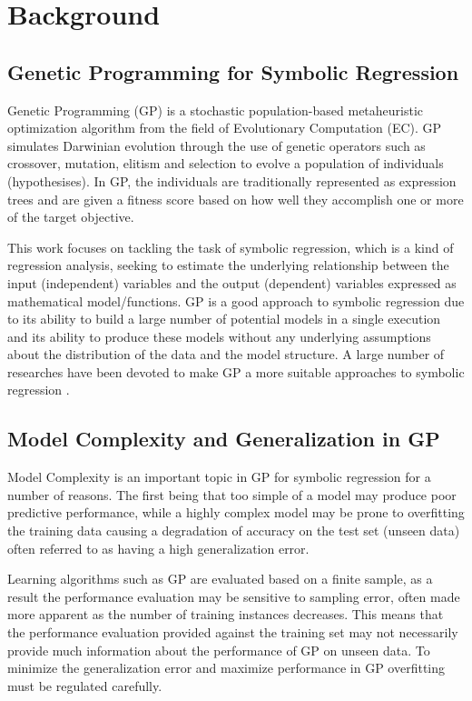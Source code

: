 \documentclass[conference]{IEEEtran}
\begin{document}
\section{Background}
\label{se:bg}

\subsection{Genetic Programming for Symbolic Regression}

Genetic Programming (GP) is a stochastic population-based metaheuristic optimization algorithm from the field of Evolutionary Computation (EC). GP simulates Darwinian evolution through the use of genetic operators such as crossover, mutation, elitism and selection to evolve a population of individuals (hypothesises). In GP, the individuals are traditionally represented as expression trees and are given a fitness score based on how well they accomplish one or more of the target objective. 


This work focuses on tackling the task of symbolic regression, which is a kind of regression analysis, seeking to estimate the underlying relationship between the input (independent) variables and the output (dependent) variables expressed as mathematical model/functions. GP is a good approach to symbolic regression due to its ability to build a large number of potential models in a single execution and its ability to produce these models without any underlying assumptions about the distribution of the data and the model structure. A large number of researches have been devoted to make GP a more suitable approaches to symbolic regression \cite{b16,b17,b18,b19}.

\subsection{Model Complexity and Generalization in GP}

Model Complexity is an important topic in GP for symbolic regression for a number of reasons. The first being that too simple of a model may produce poor predictive performance, while a highly complex model may be prone to overfitting the training data causing a degradation of accuracy on the test set (unseen data) often referred to as having a high generalization error.

Learning algorithms such as GP are evaluated based on a finite sample, as a result the performance evaluation may be sensitive to sampling error, often made more apparent as the number of training instances decreases. This means that the performance evaluation provided against the training set may not necessarily provide much information about the performance of GP on unseen data. To minimize the generalization error and maximize performance in GP overfitting must be regulated carefully.
\end{document}

